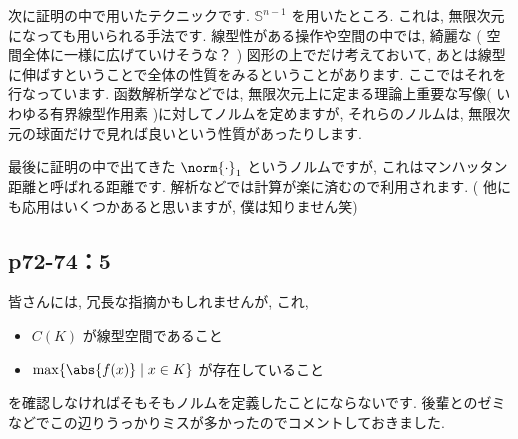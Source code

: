\documentclass[a4paper,10pt,fleqn]{ltjsarticle}
\begin{document}
次に証明の中で用いたテクニックです.  $\mathbb{S}^{n-1}$ を用いたところ. これは, 無限次元になっても用いられる手法です. 線型性がある操作や空間の中では, 綺麗な ( 空間全体に一様に広げていけそうな？ ) 図形の上でだけ考えておいて, あとは線型に伸ばすということで全体の性質をみるということがあります. ここではそれを行なっています. 函数解析学などでは, 無限次元上に定まる理論上重要な写像( いわゆる有界線型作用素 )に対してノルムを定めますが, それらのノルムは, 無限次元の球面だけで見れば良いという性質があったりします. 

最後に証明の中で出てきた $\norm{ \cdot } _ 1$ というノルムですが, これはマンハッタン距離と呼ばれる距離です. 解析などでは計算が楽に済むので利用されます. ( 他にも応用はいくつかあると思いますが, 僕は知りません笑)
\newpage

\subsection*{p72-74：5}
皆さんには, 冗長な指摘かもしれませんが, これ, 
	\begin{itemize}
		\item $C ( K )$ が線型空間であること
		\item $\max \{ \abs{ f ( x )} \mid x \in K \}$ が存在していること
\end{itemize}
を確認しなければそもそもノルムを定義したことにならないです. 後輩とのゼミなどでこの辺りうっかりミスが多かったのでコメントしておきました. \\
\end{document}

